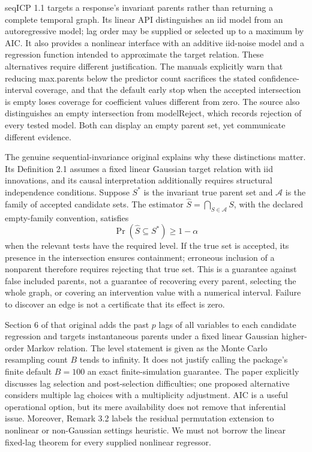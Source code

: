 seqICP 1.1 targets a response's invariant parents rather than returning a complete
temporal graph. Its linear API distinguishes an iid model from an autoregressive
model; lag order may be supplied or selected up to a maximum by AIC. It also
provides a nonlinear interface with an additive iid-noise model and a regression
function intended to approximate the target relation. These alternatives require
different justification. The manuals explicitly warn that reducing max.parents
below the predictor count sacrifices the stated confidence-interval coverage,
and that the default early stop when the accepted intersection is empty loses
coverage for coefficient values different from zero. The source also distinguishes
an empty intersection from modelReject, which records rejection of every tested
model. Both can display an empty parent set, yet communicate different evidence.
\citep{exec14_rtime_seqicp}

The genuine sequential-invariance original explains why these distinctions
matter. Its Definition 2.1 assumes a fixed linear Gaussian target relation with
iid innovations, and its causal interpretation additionally requires structural
independence conditions. Suppose \(S^*\) is the invariant true parent set and
\(\mathcal A\) is the family of accepted candidate sets. The estimator
\(\widehat S=\bigcap_{S\in\mathcal A}S\), with the declared empty-family
convention, satisfies
\[
 \Pr(\widehat S\subseteq S^*)\geq 1-\alpha
\]
when the relevant tests have the required level. If the true set is accepted,
its presence in the intersection ensures containment; erroneous inclusion of a
nonparent therefore requires rejecting that true set. This is a guarantee against
false included parents, not a guarantee of recovering every parent, selecting the
whole graph, or covering an intervention value with a numerical interval.
Failure to discover an edge is not a certificate that its effect is zero.
\citep{exec14_rtime_pfister}

Section 6 of that original adds the past \(p\) lags of all variables to each
candidate regression and targets instantaneous parents under a fixed linear
Gaussian higher-order Markov relation. The level statement is given as the
Monte Carlo resampling count \(B\) tends to infinity. It does not justify calling
the package's finite default \(B=100\) an exact finite-simulation guarantee.
The paper explicitly discusses lag selection and post-selection difficulties;
one proposed alternative considers multiple lag choices with a multiplicity
adjustment. AIC is a useful operational option, but its mere availability does
not remove that inferential issue. Moreover, Remark 3.2 labels the residual
permutation extension to nonlinear or non-Gaussian settings heuristic. We must
not borrow the linear fixed-lag theorem for every supplied nonlinear regressor.
\citep{exec14_rtime_pfister,exec14_rtime_seqicp}

